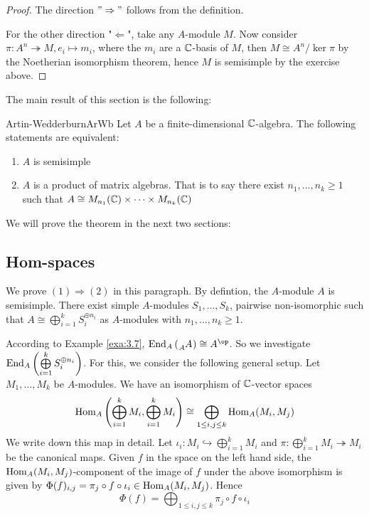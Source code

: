 \documentclass[twoside = false,	%
		headsepline,		%
		parskip = true,
		]{scrbook}						%
\begin{document}
    \begin{proof}
        The direction $"\Rightarrow"$ follows from the definition.

        For the other direction "$\Leftarrow$", take any $A$-module $M$. Now consider $\pi: A^n \twoheadrightarrow M, e_i \mapsto m_i$, where the $m_i$ are a $\mathbb C$-basis of $M$, then $M \cong A^{n}/\ker \pi$ by the Noetherian isomorphism theorem, hence $M$ is semisimple by the exercise above.
    \end{proof}

    The main result of this section is the following:

    \begin{theorem}{Artin-Wedderburn}{ArWb}
        Let $A$ be a finite-dimensional $\mathbb C$-algebra. The following statements are equivalent:
        \begin{enumerate}
            \item $A$ is semisimple
            \item $A$ is a product of matrix algebras. That is to say there exist $n_1,\dots,n_k \geq 1$ such that $A \cong M_{n_1}(\mathbb C) \times \dots \times M_{n_k}(\mathbb C)$
        \end{enumerate}
    \end{theorem}

    We will prove the theorem in the next two sections:
    
    \subsection{Hom-spaces}
        We prove $(1) \Rightarrow (2)$ in this paragraph. By defintion, the $A$-module $A$ is semisimple. There exist simple $A$-modules $S_1,\dots,S_k$, pairwise non-isomorphic such that $A \cong \bigoplus\limits_{i=1}^k S_i^{\oplus n_i}$ as $A$-modules with $n_1,\dots,n_k \geq 1$.

        According to Example \ref{exa:3.7}, $\End_A\round{\tensor[_A]{A}{}} \cong A^\op$. So we investigate $\mathrm{End}_A\left( \bigoplus\limits_{i=1}^k S_i^{\oplus n_i}\right)$. For this, we consider the following general setup. Let $M_1,\dots,M_k$ be $A$-modules. We have an isomorphism of $\mathbb C$-vector spaces
        \begin{equation*}
            \mathrm{Hom}_A\left( \bigoplus_{i=1}^k M_i,\bigoplus_{i=1}^k M_i\right) \cong \bigoplus_{1 \leq i,j \leq k} \mathrm{Hom}_A(M_i,M_j)
        \end{equation*}
        We write down this map in detail. Let $\iota_i: M_i \hookrightarrow \bigoplus_{i=1}^k M_i$ and $\pi: \bigoplus_{i=1}^k M_i \twoheadrightarrow M_i$ be the canonical maps. Given $f$ in the space on the left hand side, the $\mathrm{Hom}_A(M_i,M_j)$-component of the image of $f$ under the above isomorphism is given by $\Phi(f)_{i,j} = \pi_j \circ f \circ \iota_i \in \mathrm{Hom}_A(M_i,M_j)$. Hence
        \begin{equation*}
            \Phi(f) = \bigoplus_{1 \leq i,j \leq k} \pi_j \circ f \circ \iota_i
        \end{equation*}
\end{document}
